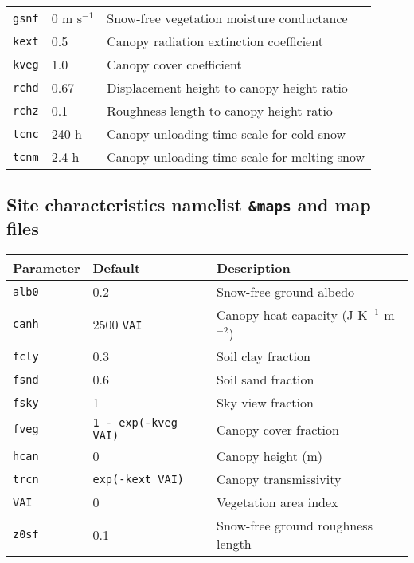 \documentclass{article}
\begin{document}
\begin{tabular}{|l|l|l|}
{\tt gsnf} & 0 m s$^{-1}$    & Snow-free vegetation moisture conductance    \\
{\tt kext} & 0.5             & Canopy radiation extinction coefficient      \\
{\tt kveg} & 1.0             & Canopy cover coefficient                     \\
{\tt rchd} & 0.67            & Displacement height to canopy height ratio   \\
{\tt rchz} & 0.1             & Roughness length to canopy height ratio      \\
{\tt tcnc} & 240 h           & Canopy unloading time scale for cold snow    \\
{\tt tcnm} & 2.4 h           & Canopy unloading time scale for melting snow \\
\hline 
\end{tabular}

\subsection*{Site characteristics namelist {\tt \&maps} and map files}

\begin{tabular}{|l|l|l|}
\hline
Parameter & Default & Description \\
\hline
{\tt alb0}  & 0.2             & Snow-free ground albedo                    \\
{\tt canh}  & 2500 {\tt VAI}  & Canopy heat capacity (J K$^{-1}$ m$^{-2}$) \\
{\tt fcly}  & 0.3             & Soil clay fraction                         \\
{\tt fsnd}  & 0.6             & Soil sand fraction                         \\
{\tt fsky}  & 1               & Sky view fraction                          \\
{\tt fveg}  & {\tt 1 - exp(-kveg VAI)}  & Canopy cover fraction            \\
{\tt hcan}  & 0               & Canopy height (m)                          \\
{\tt trcn}  & {\tt exp(-kext VAI)}  & Canopy transmissivity                \\
{\tt VAI}   & 0               & Vegetation area index                      \\
{\tt z0sf}  & 0.1             & Snow-free ground roughness length          \\
\hline 
\end{tabular}
\end{document}
